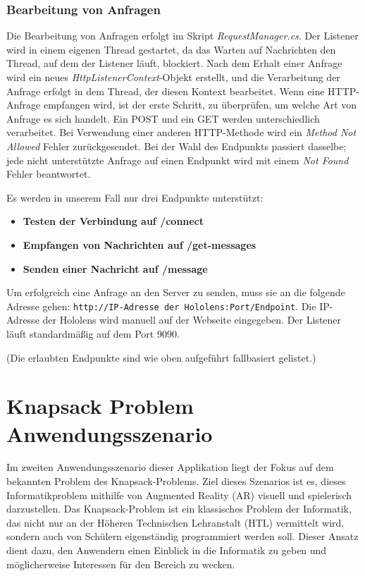 \begin{itemize}
\subsubsection{\label{sec:server}Bearbeitung von Anfragen}
Die Bearbeitung von Anfragen erfolgt im Skript \textit{RequestManager.cs}. Der Listener wird in einem eigenen Thread
gestartet, da das Warten auf Nachrichten den Thread, auf dem der Listener läuft, blockiert. Nach dem Erhalt einer Anfrage
wird ein neues \textit{HttpListenerContext}-Objekt erstellt, und die Verarbeitung der Anfrage erfolgt in dem Thread, der
diesen Kontext bearbeitet. Wenn eine HTTP-Anfrage empfangen wird, ist der erste Schritt, zu überprüfen, um welche Art von
Anfrage es sich handelt. Ein POST und ein GET werden unterschiedlich verarbeitet. Bei Verwendung einer anderen HTTP-Methode
wird ein \textit{Method Not Allowed} Fehler zurückgesendet. Bei der Wahl des Endpunkts passiert dasselbe; jede nicht
unterstützte Anfrage auf einen Endpunkt wird mit einem \textit{Not Found} Fehler beantwortet.

Es werden in unserem Fall nur drei Endpunkte unterstützt:

\begin{itemize}
    \item \textbf{Testen der Verbindung auf /connect}
    \item \textbf{Empfangen von Nachrichten auf /get-messages}
    \item \textbf{Senden einer Nachricht auf /message}
\end{itemize}

Um erfolgreich eine Anfrage an den Server zu senden, muss sie an die folgende Adresse
gehen: \texttt{http://{IP-Adresse der Hololens}:{Port}/{Endpoint}}. Die IP-Adresse der Hololens wird manuell auf der
Webseite eingegeben. Der Listener läuft standardmäßig auf dem Port 9090.

(Die erlaubten Endpunkte sind wie oben aufgeführt fallbasiert gelistet.)

\section{Knapsack Problem Anwendungsszenario}\label{sec:Scene2} 
Im zweiten Anwendungsszenario dieser Applikation liegt der Fokus auf dem bekannten Problem des Knapsack-Problems. Ziel
dieses Szenarios ist es, dieses Informatikproblem mithilfe von Augmented Reality (AR) visuell und spielerisch darzustellen.
Das Knapsack-Problem ist ein klassisches Problem der Informatik, das nicht nur an der Höheren Technischen Lehranstalt (HTL)
vermittelt wird, sondern auch von Schülern eigenständig programmiert werden soll. Dieser Ansatz dient dazu, den Anwendern
einen Einblick in die Informatik zu geben und möglicherweise Interessen für den Bereich zu wecken.


\end{itemize}
